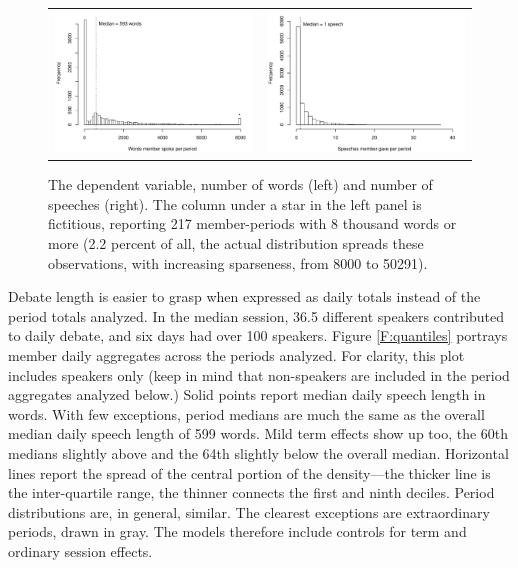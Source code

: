 \documentclass[letter,12pt]{article}
\begin{document}
\begin{figure}
  \centering
  \begin{tabular}{cc}
    \includegraphics[width=.49\columnwidth]{../plots/dv-histogram.pdf} &
    \includegraphics[width=.49\columnwidth]{../plots/dv-nspeech-histogram.pdf}
  \end{tabular}
    \caption{The dependent variable, number of words (left) and number of speeches (right). The column under a star in the left panel is fictitious, reporting 217 member-periods with 8 thousand words or more (2.2 percent of all, the actual distribution spreads these observations, with increasing sparseness, from 8000 to 50291).}\label{F:dv-hist}
\end{figure}


Debate length is easier to grasp when expressed as daily totals instead of the period totals analyzed. In the median session, 36.5 different speakers contributed to daily debate, and six days had over 100 speakers. Figure \ref{F:quantiles} portrays member daily aggregates across the periods analyzed. For clarity, this plot includes speakers only (keep in mind that non-speakers are included in the period aggregates analyzed below.) Solid points report median daily speech length in words. With few exceptions, period medians are much the same as the overall median daily speech length of 599 words. Mild term effects show up too, the 60th medians slightly above and the 64th slightly below the overall median. Horizontal lines report the spread of the central portion of the density---the thicker line is the inter-quartile range, the thinner connects the first and ninth deciles. Period distributions are, in general, similar. The clearest exceptions are extraordinary periods, drawn in gray. The models therefore include controls for term and ordinary session effects.
\end{document}
